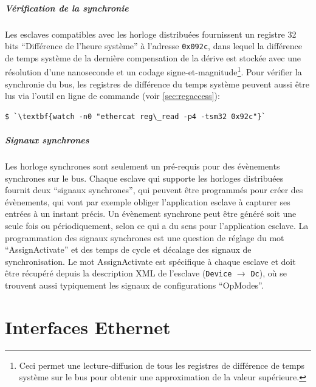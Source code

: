 \documentclass[a4paper,12pt,BCOR6mm,bibtotoc,idxtotoc]{scrbook}
\begin{document}
\paragraph{V\'erification de la synchronie}
Les esclaves compatibles avec les horloge distribu\'ees fournissent un
registre 32 bits ``Diff\'erence de l'heure syst\`eme'' \`a l'adresse
\lstinline+0x092c+, dans lequel la diff\'erence de temps syst\`eme de
la derni\`ere compensation de la d\'erive est stock\'ee avec une
r\'esolution d'une nanoseconde et un codage
signe-et-magnitude\footnote{Ceci permet une lecture-diffusion de tous
les registres de diff\'erence de temps syst\`eme sur le bus pour
obtenir une approximation de la valeur sup\'erieure.}. Pour v\'erifier
la synchronie du bus, les registres de diff\'erence du temps syst\`eme
peuvent aussi \^etre lus via l'outil en ligne de commande (voir
\autoref{sec:regaccess}):

\begin{lstlisting}
$ `\textbf{watch -n0 "ethercat reg\_read -p4 -tsm32 0x92c"}`
\end{lstlisting}

\paragraph{Signaux synchrones} Les horloge synchrones
sont seulement un pr\'e-requis pour des \'ev\`enements synchrones sur
le bus.  Chaque esclave qui supporte les horloges distribu\'ees
fournit deux ``signaux synchrones'', qui peuvent \^etre programm\'es
pour cr\'eer des \'ev\`enements, qui vont par exemple obliger
l'application esclave \`a capturer ses entr\'ees \`a un instant
pr\'ecis.  Un \'ev\`enement synchrone peut \^etre g\'en\'er\'e soit
une seule fois ou p\'eriodiquement, selon ce qui a du sens pour
l'application esclave.  La programmation des signaux synchrones est
une question de r\'eglage du mot ``AssignActivate'' et des temps
de cycle et d\'ecalage des signaux de synchronisation. Le mot
AssignActivate est sp\'ecifique \`a chaque esclave et doit \^etre
r\'ecup\'er\'e depuis la description XML de l'esclave
(\lstinline+Device+ $\rightarrow$ \lstinline+Dc+), o\`u se trouvent
aussi typiquement les signaux de configurations ``OpModes''.


\chapter{Interfaces Ethernet}
\label{sec:devices}
\end{document}
